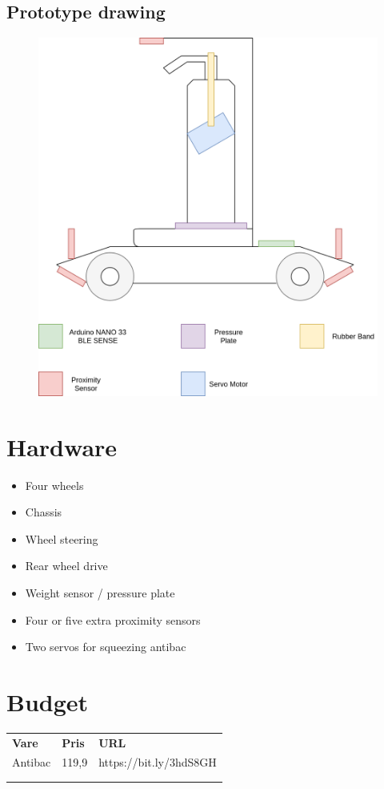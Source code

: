 \documentclass{article}
\begin{document}
\subsection{Prototype drawing}

\begin{figure}[H]
	\includegraphics[width=\linewidth]{prototype-drawing.png}
\end{figure}
\newpage
\section{Hardware}
	\begin{itemize}
		\item{Four wheels}
		\item{Chassis}
		\item{Wheel steering}
		\item{Rear wheel drive}
		\item{Weight sensor / pressure plate}
		\item{Four or five extra proximity sensors}
		\item{Two servos for squeezing antibac}
	\end{itemize}
\section{Budget}
\begin{table}[H]
\begin{tabular}{lll}
\textbf{Vare} & \textbf{Pris} & \textbf{URL}      \\
Antibac       & 119,9         & https://bit.ly/3hdS8GH \\
              &               &                   \\
              &               &                  
\end{tabular}
\end{table}
\end{document}
